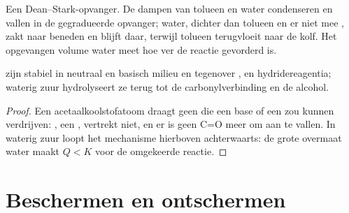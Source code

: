 \begin{omfigure}

{\small Een Dean--Stark-opvanger. De dampen van tolueen en water
condenseren en vallen in de gegradueerde opvanger; water, dichter dan
tolueen en er niet mee , zakt naar beneden en blijft daar, terwijl
tolueen terugvloeit naar de kolf. Het opgevangen volume water meet hoe
ver de reactie gevorderd is.}
\end{omfigure}

\begin{proposition}\label{prop:b1:acetals-protection:acetal-stability}
 zijn stabiel in neutraal en basisch milieu en tegenover
,  en hydridereagentia; waterig zuur
hydrolyseert ze terug tot de carbonylverbinding en de alcohol.
\end{proposition}

\begin{proof}
Een acetaalkoolstofatoom draagt geen  die een base of
een  zou kunnen verdrijven: , een ,
vertrekt niet, en er is geen C=O meer om aan te vallen. In waterig zuur
loopt het mechanisme hierboven achterwaarts: de grote overmaat water
maakt $Q < K$ voor de omgekeerde reactie.
\end{proof}

\section{Beschermen en ontschermen}

